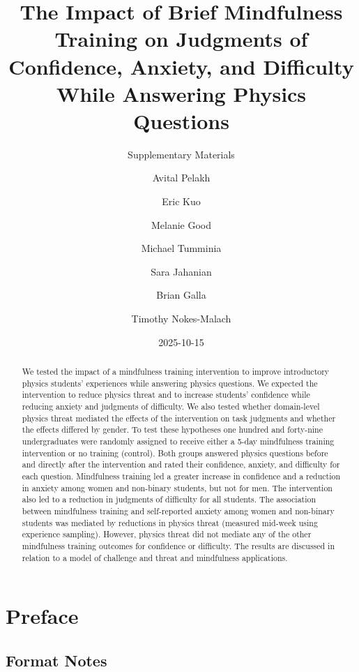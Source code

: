 \documentclass[
  letterpaper,
  DIV=11,
  numbers=noendperiod]{scrreprt}
\title{The Impact of Brief Mindfulness Training on Judgments of
Confidence, Anxiety, and Difficulty While Answering Physics Questions}
\subtitle{Supplementary Materials}
\author{Avital Pelakh \and Eric Kuo \and Melanie Good \and Michael
Tumminia \and Sara Jahanian \and Brian Galla \and Timothy Nokes-Malach}
\date{2025-10-15}
\renewcommand*\contentsname{Table of contents}
\newcommand\contentsname{Table of contents}
\begin{document}
\maketitle
\begin{abstract}
We tested the impact of a mindfulness training intervention to improve
introductory physics students' experiences while answering physics
questions. We expected the intervention to reduce physics threat and to
increase students' confidence while reducing anxiety and judgments of
difficulty. We also tested whether domain-level physics threat mediated
the effects of the intervention on task judgments and whether the
effects differed by gender. To test these hypotheses one hundred and
forty-nine undergraduates were randomly assigned to receive either a
5-day mindfulness training intervention or no training (control). Both
groups answered physics questions before and directly after the
intervention and rated their confidence, anxiety, and difficulty for
each question. Mindfulness training led a greater increase in confidence
and a reduction in anxiety among women and non-binary students, but not
for men. The intervention also led to a reduction in judgments of
difficulty for all students. The association between mindfulness
training and self-reported anxiety among women and non-binary students
was mediated by reductions in physics threat (measured mid-week using
experience sampling). However, physics threat did not mediate any of the
other mindfulness training outcomes for confidence or difficulty. The
results are discussed in relation to a model of challenge and threat and
mindfulness applications.
\end{abstract}

\renewcommand*\contentsname{Table of contents}
{
\hypersetup{linkcolor=}
\setcounter{tocdepth}{2}
\tableofcontents
}


\chapter*{Preface}\label{preface}


\section*{Format Notes}\label{format-notes}
\end{document}

